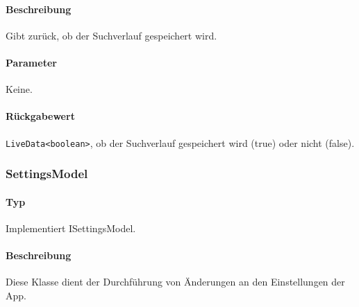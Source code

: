 \paragraph*{Beschreibung}
Gibt zurück, ob der Suchverlauf gespeichert wird.
\paragraph*{Parameter}
Keine.
\paragraph*{Rückgabewert}
\texttt{LiveData<boolean>}, ob der Suchverlauf gespeichert wird (true) oder nicht (false).

\subsubsection{SettingsModel}
\paragraph*{Typ}
Implementiert ISettingsModel.
\paragraph*{Beschreibung}
Diese Klasse dient der Durchführung von Änderungen an den Einstellungen der App.
